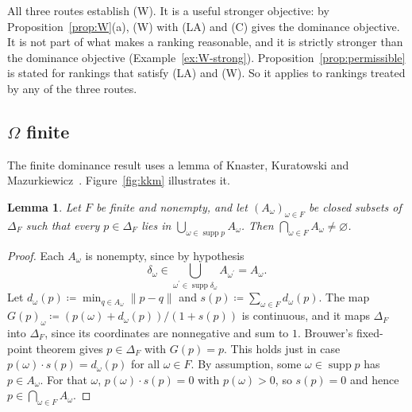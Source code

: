 \documentclass[11pt]{article}
\newtheorem{lemma}[theorem]{Lemma}
\theoremstyle{definition}
\theoremstyle{remark}
\newcommand{\supp}{\operatorname{supp}}
\begin{document}
All three routes establish (W). It is a useful stronger objective: by Proposition~\ref{prop:W}(a), (W) with (LA) and (C) gives the dominance objective. It is not part of what makes a ranking reasonable, and it is strictly stronger than the dominance objective (Example~\ref{ex:W-strong}). Proposition~\ref{prop:permissible} is stated for rankings that satisfy (LA) and (W). So it applies to rankings treated by any of the three routes.

\subsection{\texorpdfstring{$\Omega$}{Omega} finite}\label{sec:kkm}
The finite dominance result uses a lemma of Knaster, Kuratowski and Mazurkiewicz~\cite{KKM}. Figure~\ref{fig:kkm} illustrates it.

\begin{lemma}\label{lem:kkm}
Let $F$ be finite and nonempty, and let $(A_\omega)_{\omega\in F}$ be closed subsets of $\Delta_F$ such that every $p\in\Delta_F$ lies in $\bigcup_{\omega\in\supp p}A_\omega$. Then $\bigcap_{\omega\in F}A_\omega\ne\varnothing$.
\end{lemma}
\begin{proof}
Each $A_\omega$ is nonempty, since by hypothesis
\[
\delta_\omega\in\bigcup_{\omega^\prime\in\supp \delta_\omega}A_{\omega^\prime}=A_\omega.
\]
Let $d_\omega(p)\coloneqq \min_{q\in A_\omega}\lVert p-q \rVert$ and $s(p)\coloneqq \sum_{\omega\in F} d_\omega(p)$. The map $G(p)_\omega\coloneqq (p(\omega)+d_\omega(p))/(1+s(p))$ is continuous, and it maps $\Delta_F$ into $\Delta_F$, since its coordinates are nonnegative and sum to $1$. Brouwer's fixed-point theorem gives $p\in\Delta_F$ with $G(p)=p$. This holds just in case $p(\omega)\cdot s(p)=d_\omega(p)$ for all $\omega\in F$. By assumption, some $\omega\in\supp p$ has $p\in A_\omega$. For that $\omega$, $p(\omega)\cdot s(p)=0$ with $p(\omega)>0$, so $s(p)=0$ and hence $p\in\bigcap_{\omega\in F}A_\omega$.
\end{proof}
\end{document}
